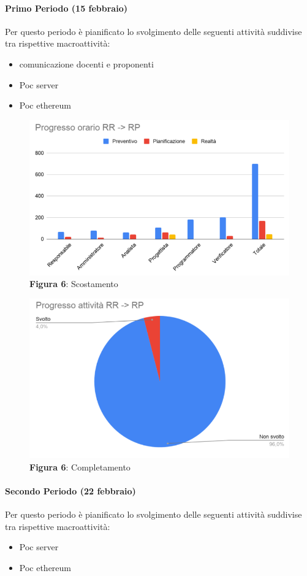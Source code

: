 \paragraph{Primo Periodo (15 febbraio)}
Per questo periodo è pianificato lo svolgimento delle seguenti attività suddivise tra rispettive macroattività:
	\begin{itemize}
		\item comunicazione docenti e proponenti
		\item Poc server
		\item Poc ethereum
	\end{itemize}


\begin{figure}[H]
	\centering
	\includegraphics[width=0.7\linewidth]{res/images/scostamento2.1.png}
	\caption*{\textbf{Figura 6}: Scostamento}
	\label{fig:Figura2}
\end{figure}
\begin{figure}[H]
	\centering
	\includegraphics[width=0.7\linewidth]{res/images/completamento2.1.png}
	\caption*{\textbf{Figura 6}: Completamento}
	\label{fig:Figura2}
\end{figure}
\paragraph{Secondo Periodo (22 febbraio)}
Per questo periodo è pianificato lo svolgimento delle seguenti attività suddivise tra rispettive macroattività:
\begin{itemize}
	\item Poc server
	\item Poc ethereum
\end{itemize}





